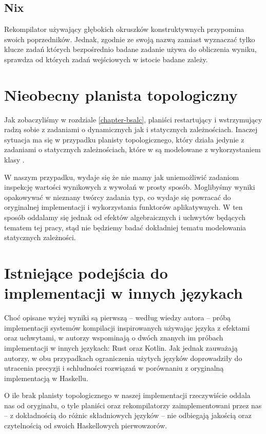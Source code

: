 \subsection{Nix}



Rekompilator używający głębokich okruszków konstruktywnych przypomina swoich poprzedników. Jednak, zgodnie ze swoją nazwą zamiast wyznaczać tylko klucze zadań których bezpośrednio badane zadanie używa do obliczenia wyniku, sprawdza od których zadań wejściowych w istocie badane zależy.




\section{Nieobecny planista topologiczny}

Jak zobaczyliśmy w rozdziale \ref{chapter-bsalc}, planiści restartujący i wstrzymujący radzą sobie z zadaniami o dynamicznych jak i statycznych zależnościach. Inaczej sytuacja ma się w przypadku planisty topologicznego, który działa jedynie z zadaniami o statycznych zależnościach, które w \BSaLC{} są modelowane z wykorzystaniem klasy .

W naszym przypadku, wydaje się że nie mamy jak uniemożliwić zadaniom inspekcję wartości wynikowych z wywołań  w prosty sposób. Moglibyśmy wyniki  opakowywać w nieznany twórcy zadania typ, co wydaje się powracać do oryginalnej implementacji i wykorzystania funktorów aplikatywnych. W ten sposób oddalamy się jednak od efektów algebraicznych i uchwytów będących tematem tej pracy, stąd nie będziemy badać dokładniej tematu modelowania statycznych zależności.

\section{Istniejące podejścia do implementacji w innych językach}

Choć opisane wyżej wyniki są pierwszą -- według wiedzy autora -- próbą implementacji systemów kompilacji inspirowanych \BSaLC{} używając języka z efektami oraz uchwytami, w \BSaLCTP{} autorzy wspominają o dwóch znanych im próbach implementacji w innych językach: Rust\cite{translation_rust} oraz Kotlin\cite{translation_kotlin}. Jak jednak zauważają autorzy, w obu przypadkach ograniczenia użytych języków doprowadziły do utracenia precyzji i schludności rozwiązań w porównaniu z oryginalną implementacją w Haskellu.

O ile brak planisty topologicznego w naszej implementacji rzeczywiście oddala nas od oryginału, o tyle planiści oraz rekompilatorzy zaimplementowani przez nas -- z dokładnością do różnic składniowych języków -- nie odbiegają jakością oraz czytelnością od swoich Haskellowych pierwowzorów.

